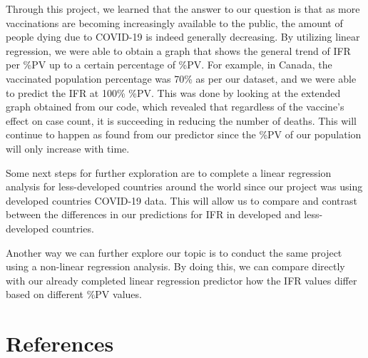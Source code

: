\documentclass[fontsize=11pt]{article}
\begin{document}

Through this project, we learned that the answer to our question is that as more vaccinations are becoming increasingly available to the public, the amount of people dying due to COVID-19 is indeed generally decreasing. By utilizing linear regression, we were able to obtain a graph that shows the general trend of IFR per \%PV up to a certain percentage of \%PV. For example, in Canada, the vaccinated population percentage was 70\% as per our dataset, and we were able to predict the IFR at 100\% \%PV. This was done by looking at the extended graph obtained from our code, which revealed that regardless of the vaccine's effect on case count, it is succeeding in reducing the number of deaths. This will continue to happen as found from our predictor since the \%PV of our population will only increase with time. 


Some next steps for further exploration are to complete a linear regression analysis for less-developed countries around the world since our project was using developed countries COVID-19 data. This will allow us to compare and contrast between the differences in our predictions for IFR in developed and less-developed countries. 

Another way we can further explore our topic is to conduct the same project using a non-linear regression analysis. By doing this, we can compare directly with our already completed linear regression predictor how the IFR values differ based on different \%PV values.






\section*{References}  
  
\end{document}
